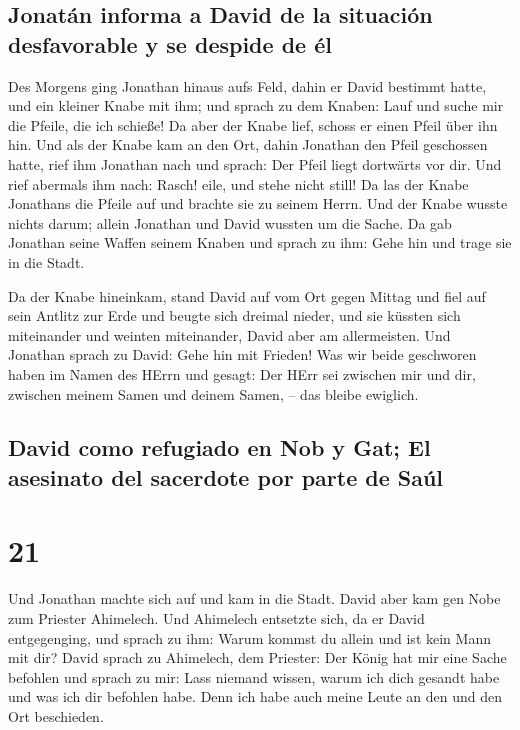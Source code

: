 \hypertarget{jonatuxe1n-informa-a-david-de-la-situaciuxf3n-desfavorable-y-se-despide-de-uxe9l}{%
\subsection{Jonatán informa a David de la situación desfavorable y se
despide de
él}\label{jonatuxe1n-informa-a-david-de-la-situaciuxf3n-desfavorable-y-se-despide-de-uxe9l}}

 Des Morgens ging Jonathan hinaus aufs Feld, dahin er
David bestimmt hatte, und ein kleiner Knabe mit ihm;  und
sprach zu dem Knaben: Lauf und suche mir die Pfeile, die ich schieße! Da
aber der Knabe lief, schoss er einen Pfeil über ihn hin. 
Und als der Knabe kam an den Ort, dahin Jonathan den Pfeil geschossen
hatte, rief ihm Jonathan nach und sprach: Der Pfeil liegt dortwärts vor
dir.  Und rief abermals ihm nach: Rasch! eile, und stehe
nicht still! Da las der Knabe Jonathans die Pfeile auf und brachte sie
zu seinem Herrn.  Und der Knabe wusste nichts darum;
allein Jonathan und David wussten um die Sache.  Da gab
Jonathan seine Waffen seinem Knaben und sprach zu ihm: Gehe hin und
trage sie in die Stadt.

 Da der Knabe hineinkam, stand David auf vom Ort gegen
Mittag und fiel auf sein Antlitz zur Erde und beugte sich dreimal
nieder, und sie küssten sich miteinander und weinten miteinander, David
aber am allermeisten.  Und Jonathan sprach zu David: Gehe
hin mit Frieden! Was wir beide geschworen haben im Namen des HErrn und
gesagt: Der HErr sei zwischen mir und dir, zwischen meinem Samen und
deinem Samen, -- das bleibe ewiglich.

\hypertarget{david-como-refugiado-en-nob-y-gat-el-asesinato-del-sacerdote-por-parte-de-sauxfal}{%
\subsection{David como refugiado en Nob y Gat; El asesinato del
sacerdote por parte de
Saúl}\label{david-como-refugiado-en-nob-y-gat-el-asesinato-del-sacerdote-por-parte-de-sauxfal}}

\hypertarget{section-20}{%
\section{21}\label{section-20}}

 Und Jonathan machte sich auf und kam in die Stadt.
 David aber kam gen Nobe zum Priester Ahimelech. Und
Ahimelech entsetzte sich, da er David entgegenging, und sprach zu ihm:
Warum kommst du allein und ist kein Mann mit dir?  David
sprach zu Ahimelech, dem Priester: Der König hat mir eine Sache befohlen
und sprach zu mir: Lass niemand wissen, warum ich dich gesandt habe und
was ich dir befohlen habe. Denn ich habe auch meine Leute an den und den
Ort beschieden.


